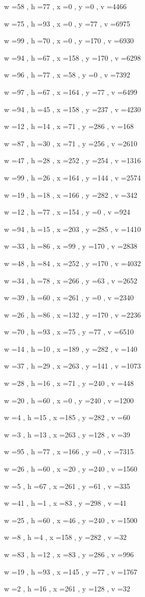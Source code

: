 \documentclass[11pt]{article}
\begin{document}
w =58 , h =77 , x =0 , y =0 , v =4466
\par
w =75 , h =93 , x =0 , y =77 , v =6975
\par
w =99 , h =70 , x =0 , y =170 , v =6930
\par
w =94 , h =67 , x =158 , y =170 , v =6298
\par
w =96 , h =77 , x =58 , y =0 , v =7392
\par
w =97 , h =67 , x =164 , y =77 , v =6499
\par
w =94 , h =45 , x =158 , y =237 , v =4230
\par
w =12 , h =14 , x =71 , y =286 , v =168
\par
w =87 , h =30 , x =71 , y =256 , v =2610
\par
w =47 , h =28 , x =252 , y =254 , v =1316
\par
w =99 , h =26 , x =164 , y =144 , v =2574
\par
w =19 , h =18 , x =166 , y =282 , v =342
\par
w =12 , h =77 , x =154 , y =0 , v =924
\par
w =94 , h =15 , x =203 , y =285 , v =1410
\par
w =33 , h =86 , x =99 , y =170 , v =2838
\par
w =48 , h =84 , x =252 , y =170 , v =4032
\par
w =34 , h =78 , x =266 , y =63 , v =2652
\par
w =39 , h =60 , x =261 , y =0 , v =2340
\par
w =26 , h =86 , x =132 , y =170 , v =2236
\par
w =70 , h =93 , x =75 , y =77 , v =6510
\par
w =14 , h =10 , x =189 , y =282 , v =140
\par
w =37 , h =29 , x =263 , y =141 , v =1073
\par
w =28 , h =16 , x =71 , y =240 , v =448
\par
w =20 , h =60 , x =0 , y =240 , v =1200
\par
w =4 , h =15 , x =185 , y =282 , v =60
\par
w =3 , h =13 , x =263 , y =128 , v =39
\par
w =95 , h =77 , x =166 , y =0 , v =7315
\par
w =26 , h =60 , x =20 , y =240 , v =1560
\par
w =5 , h =67 , x =261 , y =61 , v =335
\par
w =41 , h =1 , x =83 , y =298 , v =41
\par
w =25 , h =60 , x =46 , y =240 , v =1500
\par
w =8 , h =4 , x =158 , y =282 , v =32
\par
w =83 , h =12 , x =83 , y =286 , v =996
\par
w =19 , h =93 , x =145 , y =77 , v =1767
\par
w =2 , h =16 , x =261 , y =128 , v =32
\par
\newpage
\end{document}
